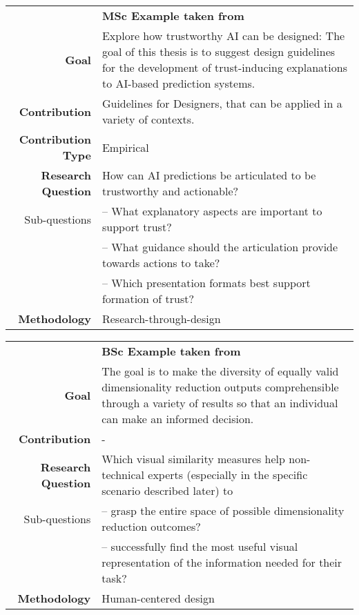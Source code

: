 \begin{table}[htb]
\small
\colorbox{usethiscolorhere}{
\centering
\begin{tabularx}{\textwidth}{@{} r Y @{}}
	&
	\textbf{MSc Example taken from ~\cite{Uga1324610}}\vspace{2mm}\\
    \textbf{Goal} & Explore how trustworthy AI can be designed: The goal of this thesis is to suggest design guidelines for the development of trust-inducing explanations to AI-based prediction systems. \vspace{2mm}\\
	\textbf{Contribution} &	Guidelines for Designers, that can be applied in a variety of contexts.\vspace{2mm}\\
	\textbf{Contribution Type} & Empirical \vspace{2mm}\\
    \textbf{Research Question} & How can AI predictions be articulated to be trustworthy and actionable?\\
    Sub-questions & -- What explanatory aspects are important to support trust?\\
    & -- What guidance should the articulation provide towards actions to take?\\
    & -- Which presentation formats best support formation of trust?\vspace{2mm}\\
	\textbf{Methodology} & Research-through-design \vspace{2mm}\\
\end{tabularx}
}
\end{table}

\begin{table}[htb]
\small
\colorbox{usethiscolorhere}{
\centering
\begin{tabularx}{\textwidth}{@{} r Y @{}}
	&
	\textbf{BSc Example taken from~\cite{Joppien2020}}\vspace{2mm}\\
    \textbf{Goal}
    & The goal is to make the diversity of equally valid dimensionality reduction outputs comprehensible through a variety of results so
that an individual can make an informed decision. \vspace{2mm}\\
	\textbf{Contribution}
	& -\vspace{2mm}\\
    \textbf{Research Question}
    & Which visual similarity measures help non-technical experts (especially
in the specific scenario described later) to\\
    Sub-questions
    & -- grasp the entire space of possible dimensionality reduction outcomes?\\
    & -- successfully find the most useful visual representation of the information needed for their task?\\
	\textbf{Methodology}
	& Human-centered design\vspace{2mm}\\
\end{tabularx}
}
\end{table}